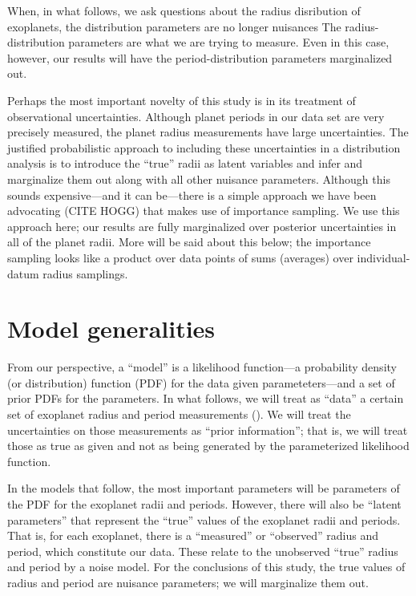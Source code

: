 \documentclass[12pt,preprint]{aastex}
\begin{document}
When, in what follows, we ask questions about the radius disribution of
exoplanets, the distribution parameters are no longer nuisances The
radius-distribution parameters are what we are trying to measure.
Even in this case, however, our results will have the period-distribution
parameters marginalized out.

Perhaps the most important novelty of this study is in its treatment of
observational uncertainties.
Although planet periods in our data set are very precisely measured, the
planet radius measurements have large uncertainties.
The justified probabilistic approach to including these uncertainties in a
distribution analysis is to introduce the ``true'' radii as latent variables
and infer and marginalize them out along with all other nuisance parameters.
Although this sounds expensive---and it can be---there is a simple approach
we have been advocating (CITE HOGG) that makes use of importance sampling.
We use this approach here; our results are fully marginalized over posterior
uncertainties in all of the planet radii.
More will be said about this below; the importance sampling looks like a
product over data points of sums (averages) over individual-datum radius
samplings.

\section{Model generalities}

From our perspective, a ``model'' is a likelihood function---a probability
density (or distribution) function (PDF) for the data given
parameteters---and a set of prior PDFs for the parameters.
In what follows, we will treat as ``data'' a certain set of exoplanet radius
and period measurements (\citealt{petigura}).
We will treat the uncertainties on those measurements as ``prior
information''; that is, we will treat those as true as given and not as being
generated by the parameterized likelihood function.

In the models that follow, the most important parameters will be parameters
of the PDF for the exoplanet radii and periods.
However, there will also be ``latent parameters'' that represent the ``true''
values of the exoplanet radii and periods.
That is, for each exoplanet, there is a ``measured'' or ``observed'' radius
and period, which constitute our data.
These relate to the unobserved ``true'' radius and period by a noise model.
For the conclusions of this study, the true values of radius and period are
nuisance parameters; we will marginalize them out.
\end{document}

